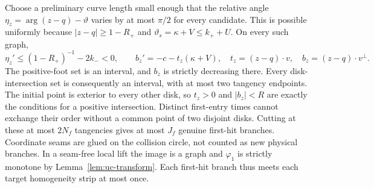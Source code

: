 Choose a preliminary curve length small enough that the relative angle
$\eta_z=\arg(z-q)-\vartheta$ varies by at most $\pi/2$ for every
candidate. This is possible uniformly because
$|z-q|\ge1-R_+$ and $\vartheta_s=\kappa+V\le k_++U$.
On every such graph,
\[
 \eta_z'\le(1-R_+)^{-1}-2k_-<0,
 \qquad b_z'=-c-t_z(\kappa+V),
 \quad t_z=(z-q)\cdot v,\quad b_z=(z-q)\cdot v^\perp.
\]
The positive-foot set is an interval, and $b_z$ is strictly decreasing
there. Every disk-intersection set is consequently an interval, with at
most two tangency endpoints. The initial point is exterior to every other
disk, so $t_z>0$ and $|b_z|<R$ are exactly the conditions for a positive
intersection. Distinct first-entry times cannot exchange their order
without a common point of two disjoint disks. Cutting at these at most
$2N_f$ tangencies gives at most $J_f$ genuine first-hit branches.
Coordinate seams are glued on the collision circle, not counted as new
physical branches. In a seam-free local lift the image is a graph and
$\varphi_1$ is strictly monotone by Lemma~\ref{lem:uc-transform}.
Each first-hit branch thus meets each target homogeneity strip at most once.


